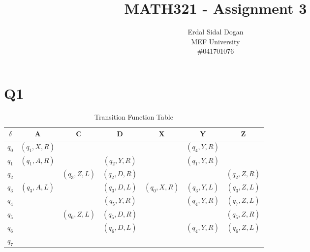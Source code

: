 \documentclass{article}
\title{MATH321 - Assignment 3}
\author{Erdal Sidal Dogan\\ MEF University\\ \#041701076}
\begin{document}
	\maketitle
	\section{Q1}
	
\begin{table}[h]
	\centering
		\begin{tabular}{c|c|c|c|c|c|c}
			$\delta$ & A & C & D & X & Y & Z \\
			\hline
			$q_0$ & $(q_1, X, R)$ & & & & $(q_4, Y, R)$ & \\
			$q_1$ & $(q_1, A, R)$  & & $(q_2, Y, R)$ & & $(q_1, Y, R)$ & \\
			$q_2$ & & $(q_3, Z, L)$ & $(q_2, D, R)$ & & & $(q_2, Z, R)$ \\
			$q_3$ & $(q_3, A, L)$ & & $(q_3, D, L)$ & $(q_0, X, R)$ & $(q_3, Y, L)$ & $(q_3, Z, L)$ \\
			$q_4$ & & & $(q_5, Y, R)$ & & $(q_4, Y, R)$&$(q_7, Z, L)$ \\
			$q_5$ & & $(q_6, Z, L)$ & $(q_5, D, R)$ & & &$(q_5, Z, R)$ \\
			$q_6$ & & & $(q_6, D, L)$ & & $(q_4, Y, R)$ & $(q_6, Z, L)$ \\
			$q_7$ & & & & & & \\

	\end{tabular}
	\caption{Transition Function Table}
\end{table}
\end{document}
